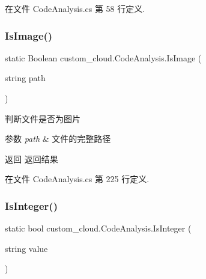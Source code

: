 在文件 Code\+Analysis.\+cs 第 58 行定义.

\mbox{\label{classcustom__cloud_1_1_code_analysis_aeb6de2f9ee300b37b6a310a0e2d9b95a}} 
\subsubsection{\texorpdfstring{Is\+Image()}{IsImage()}}
{\footnotesize\ttfamily static Boolean custom\+\_\+cloud.\+Code\+Analysis.\+Is\+Image (\begin{DoxyParamCaption}\item[{string}]{path }\end{DoxyParamCaption})\hspace{0.3cm}{\ttfamily [static]}}

判断文件是否为图片 


\begin{DoxyParams}{参数}
{\em path} & 文件的完整路径\\
\hline
\end{DoxyParams}
\begin{DoxyReturn}{返回}
返回结果
\end{DoxyReturn}


在文件 Code\+Analysis.\+cs 第 225 行定义.

\mbox{\label{classcustom__cloud_1_1_code_analysis_a6175355d66de01019390cf6bd6d6bfb3}} 
\subsubsection{\texorpdfstring{Is\+Integer()}{IsInteger()}}
{\footnotesize\ttfamily static bool custom\+\_\+cloud.\+Code\+Analysis.\+Is\+Integer (\begin{DoxyParamCaption}\item[{string}]{value }\end{DoxyParamCaption})\hspace{0.3cm}{\ttfamily [static]}}




